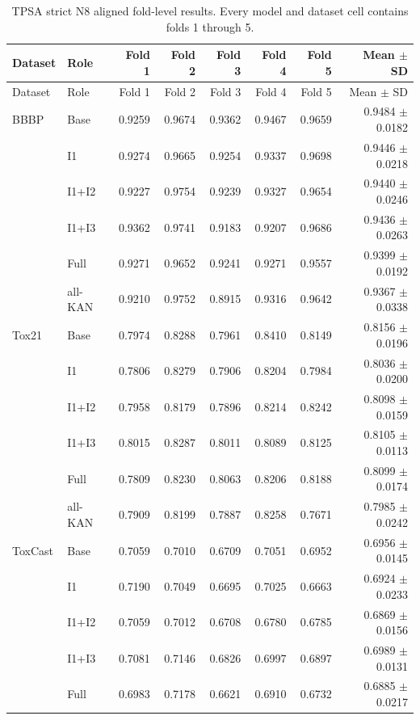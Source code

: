 \begin{landscape}
\begin{longtable}{llrrrrrr}
\caption{TPSA strict N8 aligned fold-level results. Every model and dataset cell contains folds 1 through 5.}
\label{tab:si-tpsa-fold-results}\\
\toprule
Dataset & Role & Fold 1 & Fold 2 & Fold 3 & Fold 4 & Fold 5 & Mean $\pm$ SD \\
\midrule
\endfirsthead
\toprule
Dataset & Role & Fold 1 & Fold 2 & Fold 3 & Fold 4 & Fold 5 & Mean $\pm$ SD \\
\midrule
\endhead
BBBP & Base & 0.9259 & 0.9674 & 0.9362 & 0.9467 & 0.9659 & 0.9484 $\pm$ 0.0182 \\
 & I1 & 0.9274 & 0.9665 & 0.9254 & 0.9337 & 0.9698 & 0.9446 $\pm$ 0.0218 \\
 & I1+I2 & 0.9227 & 0.9754 & 0.9239 & 0.9327 & 0.9654 & 0.9440 $\pm$ 0.0246 \\
 & I1+I3 & 0.9362 & 0.9741 & 0.9183 & 0.9207 & 0.9686 & 0.9436 $\pm$ 0.0263 \\
 & Full & 0.9271 & 0.9652 & 0.9241 & 0.9271 & 0.9557 & 0.9399 $\pm$ 0.0192 \\
 & all-KAN & 0.9210 & 0.9752 & 0.8915 & 0.9316 & 0.9642 & 0.9367 $\pm$ 0.0338 \\
\midrule
Tox21 & Base & 0.7974 & 0.8288 & 0.7961 & 0.8410 & 0.8149 & 0.8156 $\pm$ 0.0196 \\
 & I1 & 0.7806 & 0.8279 & 0.7906 & 0.8204 & 0.7984 & 0.8036 $\pm$ 0.0200 \\
 & I1+I2 & 0.7958 & 0.8179 & 0.7896 & 0.8214 & 0.8242 & 0.8098 $\pm$ 0.0159 \\
 & I1+I3 & 0.8015 & 0.8287 & 0.8011 & 0.8089 & 0.8125 & 0.8105 $\pm$ 0.0113 \\
 & Full & 0.7809 & 0.8230 & 0.8063 & 0.8206 & 0.8188 & 0.8099 $\pm$ 0.0174 \\
 & all-KAN & 0.7909 & 0.8199 & 0.7887 & 0.8258 & 0.7671 & 0.7985 $\pm$ 0.0242 \\
\midrule
ToxCast & Base & 0.7059 & 0.7010 & 0.6709 & 0.7051 & 0.6952 & 0.6956 $\pm$ 0.0145 \\
 & I1 & 0.7190 & 0.7049 & 0.6695 & 0.7025 & 0.6663 & 0.6924 $\pm$ 0.0233 \\
 & I1+I2 & 0.7059 & 0.7012 & 0.6708 & 0.6780 & 0.6785 & 0.6869 $\pm$ 0.0156 \\
 & I1+I3 & 0.7081 & 0.7146 & 0.6826 & 0.6997 & 0.6897 & 0.6989 $\pm$ 0.0131 \\
 & Full & 0.6983 & 0.7178 & 0.6621 & 0.6910 & 0.6732 & 0.6885 $\pm$ 0.0217 \\

\end{longtable}
\end{landscape}
